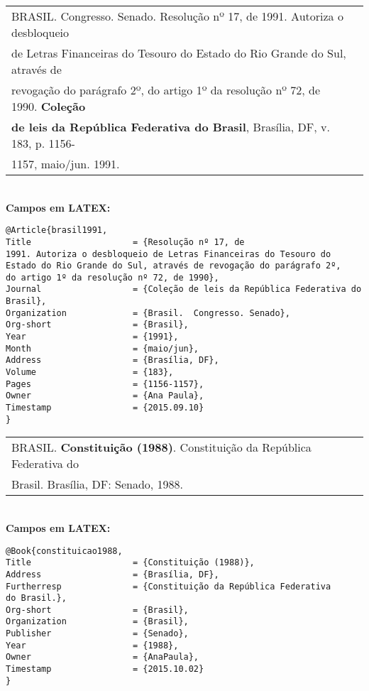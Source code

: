 \begin{tabular}{|l|c|} \hline
	BRASIL. Congresso. Senado. Resolução nº 17, de 1991. Autoriza o desbloqueio \\ de Letras Financeiras do Tesouro do Estado do Rio Grande do Sul, através de \\ revogação do parágrafo 2º, do artigo 1º da resolução nº 72, de
	1990. \textbf{Coleção} \\ \textbf{de leis da República Federativa do Brasil}, Brasília, DF, v.
	183, p. 1156-\\1157, maio/jun. 1991.
	\\\hline
\end{tabular} \\

\textbf{Campos em LATEX:} 


\begin{verbatim}
@Article{brasil1991,
Title                    = {Resolução nº 17, de
1991. Autoriza o desbloqueio de Letras Financeiras do Tesouro do 
Estado do Rio Grande do Sul, através de revogação do parágrafo 2º, 
do artigo 1º da resolução nº 72, de 1990},
Journal                  = {Coleção de leis da República Federativa do 
Brasil},
Organization             = {Brasil.  Congresso. Senado},
Org-short                = {Brasil},
Year                     = {1991},
Month                    = {maio/jun},
Address                  = {Brasília, DF},
Volume                   = {183},
Pages                    = {1156-1157},
Owner                    = {Ana Paula},
Timestamp                = {2015.09.10}
}
\end{verbatim}

\begin{tabular}{|l|c|} \hline
	BRASIL. \textbf{Constituição (1988)}. Constituição da República Federativa do \\Brasil. Brasília, DF: Senado, 1988. 
	\\\hline
\end{tabular} \\

\textbf{Campos em LATEX:} 

\begin{verbatim}
@Book{constituicao1988,
Title                    = {Constituição (1988)},
Address                  = {Brasília, DF},
Furtherresp              = {Constituição da República Federativa 
do Brasil.},
Org-short                = {Brasil},
Organization             = {Brasil},
Publisher                = {Senado},
Year                     = {1988},
Owner                    = {AnaPaula},
Timestamp                = {2015.10.02}
}
\end{verbatim}

